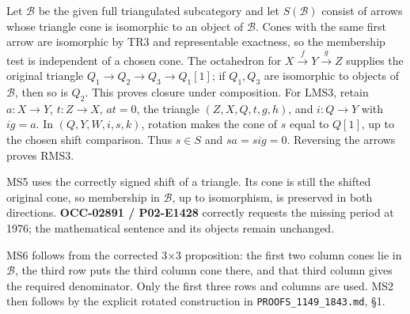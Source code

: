 Let \(\mathcal B\) be the given full triangulated subcategory and let \(S(\mathcal B)\) consist of arrows whose triangle cone is isomorphic to an object of \(\mathcal B\). Cones with the same first arrow are isomorphic by TR3 and representable exactness,\allowbreak{} so the membership test is independent of a chosen cone. The octahedron for \(X\xrightarrow fY\xrightarrow gZ\) supplies the original triangle \(Q_1\to Q_2\to Q_3\to Q_1[1]\); if \(Q_1,Q_3\) are isomorphic to objects of \(\mathcal B\),\allowbreak{} then so is \(Q_2\). This proves closure under composition. For LMS3,\allowbreak{} retain \(a:X\to Y\),\allowbreak{} \(t:Z\to X\),\allowbreak{} \(at=0\),\allowbreak{} the triangle \((Z,X,Q,t,g,h)\),\allowbreak{} and \(i:Q\to Y\) with \(ig=a\). In \((Q,Y,W,i,s,k)\),\allowbreak{} rotation makes the cone of \(s\) equal to \(Q[1]\),\allowbreak{} up to the chosen shift comparison. Thus \(s\in S\) and \(sa=sig=0\). Reversing the arrows proves RMS3.

MS5 uses the correctly signed shift of a triangle. Its cone is still the shifted original cone,\allowbreak{} so membership in \(\mathcal B\),\allowbreak{} up to isomorphism,\allowbreak{} is preserved in both directions. \textbf{OCC-02891 /\allowbreak{} P02-E1428} correctly requests the missing period at 1976; the mathematical sentence and its objects remain unchanged.

MS6 follows from the corrected 3×3 proposition:\allowbreak{} the first two column cones lie in \(\mathcal B\),\allowbreak{} the third row puts the third column cone there,\allowbreak{} and that third column gives the required denominator. Only the first three rows and columns are used. MS2 then follows by the explicit rotated construction in \texttt{PROOFS\_\allowbreak{}1149\_\allowbreak{}1843.\allowbreak{}md},\allowbreak{} §1.

